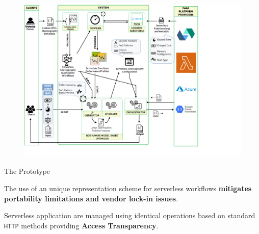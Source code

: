 \documentclass[13.5pt]{beamer}
\newcommand{\B}[1]{\textcolor{TorVergataColor}{\textbf{#1}}}
\begin{document}
\begin{frame}

\begin{figure}[h]
	\centering
	\includegraphics[width=\textwidth]{../Images/SystemForSlide.png}
\end{figure}


\end{frame} 
\begin{frame}{The Prototype}
	
	\begin{block}{}
		\centering
		The use of an unique representation scheme for serverless workflows \B{mitigates portability limitations and vendor lock-in issues}.
	\end{block}

	\vspace{\baselineskip}

	\begin{block}{}
		\centering
		Serverless application are managed using identical operations based on standard \texttt{HTTP} methods providing \B{Access Transparency}.
	\end{block}

\end{frame} 
\end{document}
